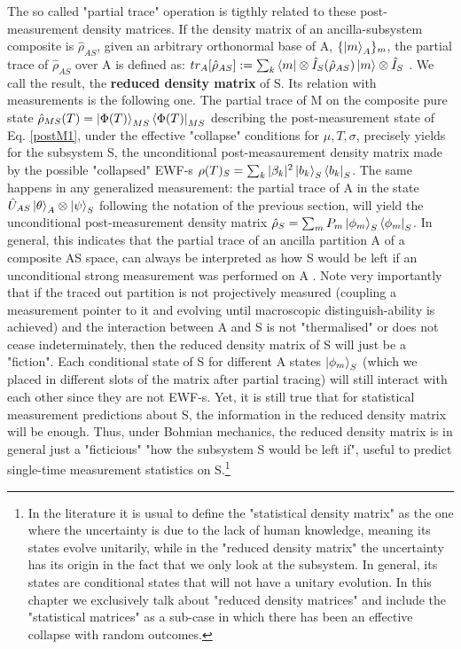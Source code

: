 \documentclass[11pt, a4paper]{article} %
\begin{document}
The so called "partial trace" operation is tigthly related to these post-measurement density matrices. If the density matrix of an ancilla-subsystem composite is $\hat{\rho}_{AS}$, given an arbitrary orthonormal base of A, $\{\ket{m}_A\}_m$, the partial trace of $\hat{\rho}_{AS}$ over A is defined as: $tr_{A}[\hat{\rho}_{AS}] := \sum_k \bra{m}\otimes \hat{I}_S(\hat{\rho}_{AS})\ket{m}\otimes \hat{I}_S$ \cite{Generalized, Durr}. We call the result, the {\bf reduced density matrix} of S. Its relation with measurements is the following one. The partial trace of M on the composite pure state $\hat{\rho}_{MS}(T)=\ket{\Phi(T)}_{MS}\bra{\Phi(T)}_{MS}$ describing the post-measurement state of Eq. \eqref{postM1}, under the effective "collapse" conditions for $\mu,T,\sigma$, precisely yields for the subsystem S, the unconditional post-measaurement density matrix made by the possible "collapsed" EWF-s $\rho(T)_S=\sum_k |\beta_k|^2\ket{b_k}_S\bra{b_k}_S$. The same happens in any generalized measurement: the partial trace of A in the state $\hat{U}_{AS}\ket{\theta}_A\otimes\ket{\psi}_S$ following the notation of the previous section, will yield the unconditional post-measurement density matrix $\hat{\rho}_S=\sum_m P_m \ket{\phi_m}_S\bra{\phi_m}_S$. In general, this indicates that the partial trace of an ancilla partition A of a composite AS space, can always be interpreted as how S would be left if an unconditional strong measurement was performed on A \cite{Generalized}. Note very importantly that if the traced out partition is not projectively measured (coupling a measurement pointer to it and evolving until macroscopic distinguish-ability is achieved) and the interaction between A and S is not "thermalised" or does not cease indeterminately, then the reduced density matrix of S will just be a "fiction". Each conditional state of S for different A states $\ket{\phi_m}_S$ (which we placed in different slots of the matrix after partial tracing) will still interact with each other since they are not EWF-s. Yet, it is still true that for statistical measurement predictions about S, the information in the reduced density matrix will be enough. Thus, under Bohmian mechanics, the reduced density matrix is in general just a "ficticious" "how the subsystem S would be left if", useful to predict single-time measurement statistics on S.\footnote{In the literature \cite{density} it is usual to define the "statistical density matrix" as the one where the uncertainty is due to the lack of human knowledge, meaning its states evolve unitarily, while in the "reduced density matrix" the uncertainty has its origin in the fact that we only look at the subsystem. In general, its states are conditional states that will not have a unitary evolution. In this chapter we exclusively talk about "reduced density matrices" and include the "statistical matrices" as a sub-case in which there has been an effective collapse with random outcomes.}\vspace{-0.2cm}
\end{document}
